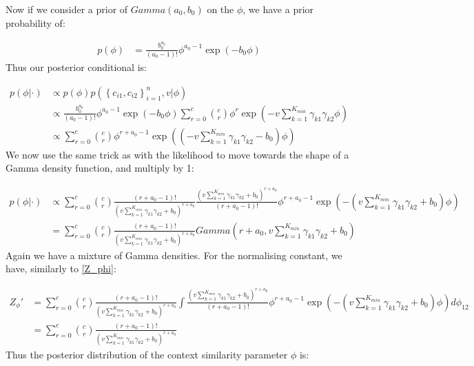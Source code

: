 \documentclass[11pt]{article} %
\begin{document}
Now if we consider a prior of $Gamma(a_0, b_0)$ on the $\phi$, we have a prior probability of:

\begin{align}
p(\phi) &= \frac{b_0^{a_0}}{(a_0 - 1)!}\phi^{a_0 - 1}\exp\left(-b_0 \phi \right)
\end{align}
Thus our posterior conditional is:


\begin{align}
p(\phi | \cdot) &\propto p(\phi) p(\left\{c_{i1}, c_{i2}\right\}_{i=1}^n, v | \phi)  \\
&\propto \frac{b_0^{a_0}}{(a_0 - 1)!}\phi^{a_0 - 1}\exp\left(-b_0 \phi \right)  \sum_{r=0}^c  \binom{c}{r}\phi^r \exp\left(-v \sum_{k=1}^{K_{min}} \gamma_{k1} \gamma_{k2}\phi\right) \\
&\propto \sum_{r=0}^c  \binom{c}{r} \phi^{r + a_0 - 1} \exp \left( \left(-v \sum_{k=1}^{K_{min}} \gamma_{k1} \gamma_{k2}  -b_0 \right)\phi\right)
\end{align}
We now use the same trick as with the likelihood to move towards the shape of a Gamma density function, and multiply by 1:

\begin{align}
p(\phi | \cdot) &\propto \sum_{r=0}^c  \binom{c}{r} \frac{(r + a_0 - 1)!}{ \left(v \sum_{k=1}^{K_{min}} \gamma_{k1} \gamma_{k2} + b_0 \right)^{r + a_0}} \frac{ \left(v \sum_{k=1}^{K_{min}} \gamma_{k1} \gamma_{k2} + b_0 \right)^{r + a_0}}{(r + a_0 - 1)!} \phi^{r + a_0 - 1} \exp \left( - \left(v \sum_{k=1}^{K_{min}} \gamma_{k1} \gamma_{k2} + b_0 \right)\phi\right) \\
&= \sum_{r=0}^c  \binom{c}{r} \frac{(r + a_0 - 1)!}{ \left(v \sum_{k=1}^{K_{min}} \gamma_{k1} \gamma_{k2} + b_0 \right)^{r + a_0}} Gamma \left(r+ a_0, v \sum_{k=1}^{K_{min}} \gamma_{k1} \gamma_{k2} + b_0 \right)
\end{align}
Again we have a mixture of Gamma densities. For the normalising constant, we have, similarly to \eqref{Z_phi}:

\begin{align}
Z_{\phi}' &=\sum_{r=0}^c  \binom{c}{r} \frac{(r + a_0 - 1)!}{ \left(v \sum_{k=1}^{K_{min}} \gamma_{k1} \gamma_{k2} + b_0 \right)^{r + a_0}}  \int \frac{ \left(v \sum_{k=1}^{K_{min}} \gamma_{k1} \gamma_{k2} + b_0 \right)^{r + a_0}}{(r + a_0 - 1)!} \phi^{r + a_0 - 1} \exp \left( - \left(v \sum_{k=1}^{K_{min}} \gamma_{k1} \gamma_{k2} + b_0 \right)\phi\right) d\phi_{12} \\
&= \sum_{r=0}^c \binom{c}{r} \frac{(r + a_0 - 1)!}{ \left(v \sum_{k=1}^{K_{min}} \gamma_{k1} \gamma_{k2} + b_0 \right)^{r + a_0}} 
\end{align}
Thus the posterior distribution of the context similarity parameter $\phi$ is:
\end{document}
